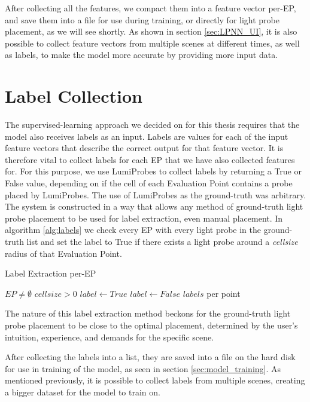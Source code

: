 After collecting all the features, we compact them into a feature vector per-EP, and save them into a file for use during training, or directly for light probe placement, as we will see shortly. As shown in section \ref{sec:LPNN_UI}, it is also possible to collect feature vectors from multiple scenes at different times, as well as labels, to make the model more accurate by providing more input data. 

\section{Label Collection}

The supervised-learning approach we decided on for this thesis requires that the model also receives labels as an input. Labels are values for each of the input feature vectors that describe the correct output for that feature vector. It is therefore vital to collect labels for each EP that we have also collected features for. For this purpose, we use LumiProbes \parencite{Vardis2021} to collect labels by returning a True or False value, depending on if the cell of each Evaluation Point contains a probe placed by LumiProbes. The use of LumiProbes as the ground-truth was arbitrary. The system is constructed in a way that allows any method of ground-truth light probe placement to be used for label extraction, even manual placement. In algorithm \ref{alg:labels} we check every EP with every light probe in the ground-truth list and set the label to True if there exists a light probe around a \textit{cellsize} radius of that Evaluation Point.

\begin{algorithm}
	\caption{Label Extraction per-EP}
	\label{alg:labels}
	\begin{algorithmic}[1]
		\Require $EP \neq \emptyset$
		\Require $cellsize > 0$
					\State $label \gets True$
				\Else
					\State $label \gets False$
				\EndIf
			\EndFor
		\EndFor
		\State \Return $labels$ per point
	\end{algorithmic}
\end{algorithm}

The nature of this label extraction method beckons for the ground-truth light probe placement to be close to the optimal placement, determined by the user's intuition, experience, and demands for the specific scene.

After collecting the labels into a list, they are saved into a file on the hard disk for use in training of the model, as seen in section \ref{sec:model_training}. As mentioned previously, it is possible to collect labels from multiple scenes, creating a bigger dataset for the model to train on.

